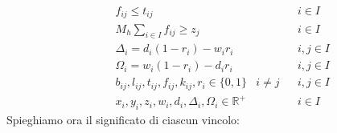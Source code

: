 \begin{align}
	  &             &   & f_{ij} \leq t_{ij}                                                           &          &   & i \in I \label{equa67}   \\
	  &             &   & M_h \sum_{i \in I} f_{ij} \geq z_j                                           &          &   & i \in I \label{equa68}   \\
	  &             &   & \Delta_i = d_i (1 - r_i) - w_i r_i                                           &          &   & i,j \in I \label{equa69} \\
	  &             &   & \Omega_i = w_i (1 - r_i) - d_i r_i                                           &          &   & i,j \in I \label{equa70} \\  
	  &             &   & b_{ij}, l_{ij}, t_{ij}, f_{ij}, k_{ij}, r_i \in \{0,1\}                      & i \neq j &   & i,j \in I \label{equa71} \\
	  &             &   & x_{i}, y_{i}, z_{i}, w_{i}, d_{i}, \Delta_{i}, \Omega_{i} \in \mathbb{R}^{+} &          &   & i \in I  \label{equa72}  
\end{align}
\newpage
Spieghiamo ora il significato di ciascun vincolo:
